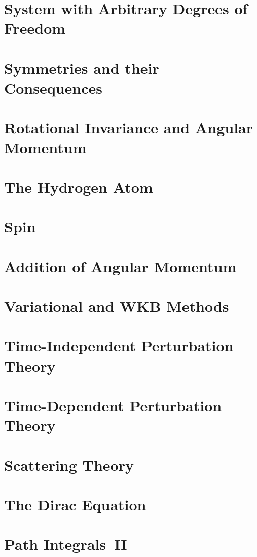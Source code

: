 \documentclass[10pt,twocolumn,leqno]{article}
\theoremstyle{theorem}
\theoremstyle{example}
\theoremstyle{exercise}
\numberwithin{equation}{subsection}
\begin{document}
\section{System with Arbitrary Degrees of Freedom}


\section{Symmetries and their Consequences}


\section{Rotational Invariance and Angular Momentum}


\section{The Hydrogen Atom}


\section{Spin}


\section{Addition of Angular Momentum}


\section{Variational and WKB Methods}


\section{Time-Independent Perturbation Theory}


\section{Time-Dependent Perturbation Theory}


\section{Scattering Theory}


\section{The Dirac Equation}


\section{Path Integrals--II}


\appendix

\end{document}

